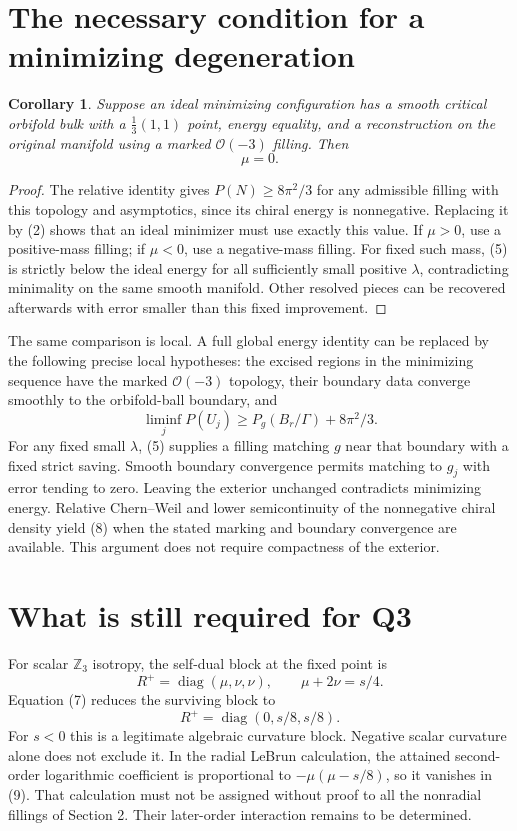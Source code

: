 \documentclass[11pt]{article}
\newtheorem{corollary}[theorem]{Corollary}
\begin{document}
\section{The necessary condition for a minimizing degeneration}
\begin{corollary}
Suppose an ideal minimizing configuration has a smooth critical orbifold
bulk with a $\frac13(1,1)$ point, energy equality, and a reconstruction
on the original manifold using a marked $\mathcal O(-3)$ filling.
Then
\[
                    \boxed{\mu=0.}                 \tag{7}
\]
\end{corollary}
\begin{proof}
The relative identity gives $P(N)\ge8\pi^2/3$ for any admissible
filling with this topology and asymptotics, since its chiral energy is
nonnegative. Replacing it by (2) shows that an ideal minimizer must use
exactly this value. If $\mu>0$, use a positive-mass filling; if
$\mu<0$, use a negative-mass filling. For fixed such mass, (5) is
strictly below the ideal energy for all sufficiently small positive
$\lambda$, contradicting minimality on the same smooth manifold.
Other resolved pieces can be recovered afterwards with error smaller
than this fixed improvement.
\end{proof}

The same comparison is local. A full global energy identity can be
replaced by the following precise local hypotheses: the excised regions
in the minimizing sequence have the marked $\mathcal O(-3)$ topology,
their boundary data converge smoothly to the orbifold-ball boundary,
and
\[
 \liminf_jP(U_j)\ge P_g(B_r/\Gamma)+8\pi^2/3.        \tag{8}
\]
For any fixed small $\lambda$, (5) supplies a filling matching $g$
near that boundary with a fixed strict saving. Smooth boundary
convergence permits matching to $g_j$ with error tending to zero.
Leaving the exterior unchanged contradicts minimizing energy. Relative
Chern--Weil and lower semicontinuity of the nonnegative chiral density
yield (8) when the stated marking and boundary convergence are available.
This argument does not require compactness of the exterior.

\section{What is still required for Q3}
For scalar $\mathbb Z_3$ isotropy, the self-dual block at the fixed point is
\[
 R^+=\operatorname{diag}(\mu,\nu,\nu),\qquad
 \mu+2\nu=s/4.
\]
Equation (7) reduces the surviving block to
\[
                  R^+=\operatorname{diag}(0,s/8,s/8).       \tag{9}
\]
For $s<0$ this is a legitimate algebraic curvature block. Negative
scalar curvature alone does not exclude it. In the radial LeBrun
calculation, the attained second-order logarithmic coefficient is
proportional to $-\mu(\mu-s/8)$, so it vanishes in (9). That calculation
must not be assigned without proof to all the nonradial fillings of
Section 2. Their later-order interaction remains to be determined.
\end{document}
